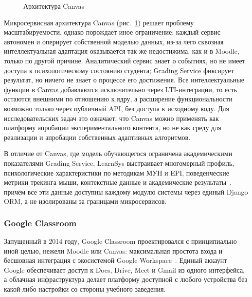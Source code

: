 \begin{figure}[H]
\caption{Архитектура Canvas}
\label{fig:canvas_arch}
\end{figure}

Микросервисная архитектура Canvas (рис.~\ref{fig:canvas_arch})
решает проблему масштабируемости, однако порождает иное
ограничение: каждый сервис автономен и оперирует собственной
моделью данных, из-за чего сквозная интеллектуальная
адаптация оказывается так же недостижима, как и в Moodle,
только по другой причине. Аналитический сервис знает о
событиях, но не имеет доступа к психологическому состоянию
студента; Grading Service фиксирует результат, но ничего
не знает о процессе его достижения. Все интеллектуальные
функции в Canvas добавляются исключительно через
LTI-интеграции, то есть остаются внешними по
отношению к ядру, а расширение функциональности возможно
только через публичный API, без доступа к исходному коду.
Для исследовательских задач это означает, что Canvas можно
применять как платформу апробации 
экспериментального контента, но не как среду для реализации
и апробации собственных адаптивных алгоритмов.

В отличие от Canvas, где модель обучающегося ограничена
академическими показателями Grading Service, LearnSys
выстраивает многомерный профиль, психологические
характеристики по методикам МУН и EPI, поведенческие
метрики трекинга мыши, контекстные данные и академические
результаты~\cite{brusilovsky2001adaptive}, причём все эти
данные доступны каждому модулю системы через единый Django
ORM, а не изолированы за границами микросервисов.

\subsubsection{Google Classroom}

Запущенный в 2014 году, Google Classroom проектировался
с принципиально иной целью, нежели Moodle или Canvas:
максимальная простота входа и бесшовная интеграция с
экосистемой Google Workspace~\cite{googleclassroom2026official}.
Единый аккаунт Google обеспечивает доступ к Docs, Drive,
Meet и Gmail из одного интерфейса, а облачная инфраструктура
делает платформу доступной с любого устройства без какой-либо
настройки со стороны учебного заведения.

